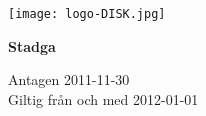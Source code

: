 \begin{titlepage}
\begin{center}
\texttt{[image: logo-DISK.jpg]}
\vfill

\fontsize{50}{60}\selectfont \bfseries Stadga

\vfill

\normalsize Antagen 2011-11-30\\Giltig från och med 2012-01-01


\end{center}
\end{titlepage}
